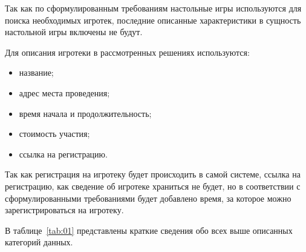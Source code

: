 Так как по сформулированным требованиям настольные игры используются для поиска
необходимых игротек, последние описанные характеристики в сущность настольной
игры включены не будут.

\clearpage
Для описания игротеки в рассмотренных решениях используются:
\begin{itemize}
    \item название;
    \item адрес места проведения;
    \item время начала и продолжительность;
    \item стоимость участия;
    \item ссылка на регистрацию.
\end{itemize}

Так как регистрация на игротеку будет происходить в самой системе, ссылка на
регистрацию, как сведение об игротеке храниться не будет, но в соответствии с
сформулированными требованиями будет добавлено время, за которое можно
зарегистрироваться на игротеку.

В таблице~\ref{tab:01} представлены краткие сведения обо всех выше описанных
категорий данных.

